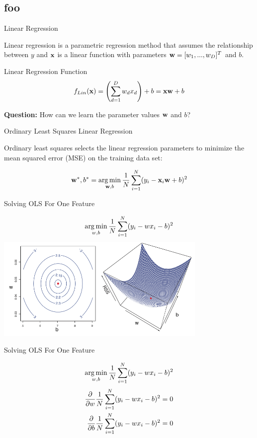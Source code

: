 \documentclass[serif,xcolor=pdftex,dvipsnames,table,hyperref={bookmarks=false,breaklinks}]{beamer}
\begin{document}
\subsection{foo}

\begin{frame}[t]{Linear Regression}

Linear regression is a parametric regression method that assumes the relationship between $y$ and ${\mathbf{x}}$ is a linear function with parameters ${\mathbf{w}}=[w_1,...,w_D]^T$ and $b$.

\pause
\begin{block}{Linear Regression Function}
$$f_{Lin}({\mathbf{x}}) = \left(\sum_{d=1}^D w_d x_d\right) + b = {\mathbf{x}}{\mathbf{w}}+b$$
\end{block}

\pause \textbf{Question:} How can we learn the parameter values ${\mathbf{w}}$ and $b$? 
\end{frame}

\begin{frame}[t]{Ordinary Least Squares Linear Regression}

Ordinary least squares selects the linear regression parameters to minimize the 
mean squared error (MSE) on the training data set:

\pause 
$${\mathbf{w}}^*,b^* = \operatorname*{arg\,min}_{{\mathbf{w}},b} \frac{1}{N}\sum_{i=1}^N(y_i - {\mathbf{x}}_i{\mathbf{w}}+b)^2$$

\end{frame}

\begin{frame}[t]{Solving OLS For One Feature}

$$\operatorname*{arg\,min}_{w,b} \frac{1}{N}\sum_{i=1}^N(y_i - wx_i-b)^2$$
\pause
\includegraphics[width=4in]{../Figures/ols_objective.png}

\end{frame}

\begin{frame}[t]{Solving OLS For One Feature}

$$\operatorname*{arg\,min}_{w,b} \frac{1}{N}\sum_{i=1}^N(y_i - wx_i-b)^2$$
\pause
\begin{align*}
\frac{\partial{}}{\partial{w}}\frac{1}{N}\sum_{i=1}^N(y_i - wx_i-b)^2&=0\\
\frac{\partial{}}{\partial{b}}\frac{1}{N}\sum_{i=1}^N(y_i - wx_i-b)^2&=0\\
\end{align*}

\end{frame}
\end{document}
